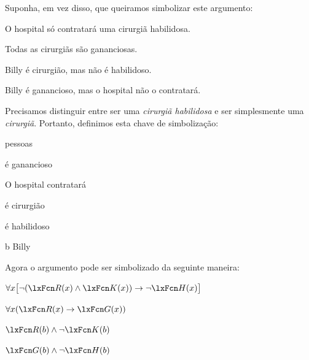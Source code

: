 Suponha, em vez disso, que queiramos simbolizar este argumento:
\begin{earg}
\item O hospital só contratará uma cirurgiã habilidosa.
\item Todas as cirurgiãs são gananciosas.
\item Billy é cirurgião, mas não é habilidoso.
\item[\texttherefore] Billy é ganancioso, mas o hospital não o contratará.
\end{earg}
Precisamos distinguir entre ser uma \emph{cirurgiã habilidosa} e ser simplesmente uma \emph{cirurgiã}. Portanto, definimos esta chave de simbolização:
\begin{ekey}
\item[\text{domínio}] pessoas
\item[\atom{G}{x}]  é ganancioso
\item[\atom{H}{x}] O hospital contratará 
\item[\atom{R}{x}]  é cirurgião
\item[\atom{K}{x}]  é habilidoso
\item[b] Billy
\end{ekey}

Agora o argumento pode ser simbolizado da seguinte maneira:
\begin{earg}
\label{surgeon2}
\item[] $\forall x\bigl[\enot (\atom{R}{x} \eand \atom{K}{x}) \eif \enot \atom{H}{x}\bigr]$
\item[] $\forall x(\atom{R}{x} \eif \atom{G}{x})$
\item[] $\atom{R}{b} \eand \enot \atom{K}{b}$
\item[\texttherefore] $\atom{G}{b} \eand \enot \atom{H}{b}$
\end{earg}

